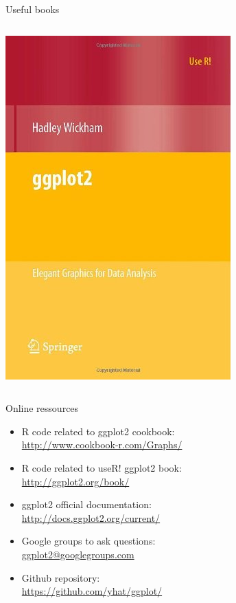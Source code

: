 \documentclass{beamer}\usepackage[]{graphicx}\usepackage[]{color}
\begin{document}
\begin{frame}{Useful books}
\begin{columns}
    \begin{column}{0.5\textwidth}
      \includegraphics[scale=0.45]{ggplot2}
    \end{column}
  \end{columns}
\end{frame}

\begin{frame}{Online ressources}
    	\begin{itemize}
      
      \item R code related to ggplot2 cookbook:\\ \url{http://www.cookbook-r.com/Graphs/}
      \item R code related to useR! ggplot2 book:\\ \url{http://ggplot2.org/book/}
  		\item ggplot2 official documentation:\\  \url{http://docs.ggplot2.org/current/}
			\item Google groups to ask questions:\\ \url{ggplot2@googlegroups.com}
      \item Github repository:\\ \url{https://github.com/yhat/ggplot/}
			\end{itemize}
\end{frame}
\end{document}
